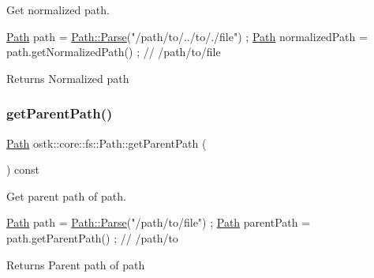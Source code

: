 Get normalized path. 


\begin{DoxyCode}
\hyperlink{classostk_1_1core_1_1fs_1_1_path_a1a5fff28594542489223b4cfad6cc9fb}{Path} path = \hyperlink{classostk_1_1core_1_1fs_1_1_path_ad08539ba654f5df11c4bcb07276345ad}{Path::Parse}(\textcolor{stringliteral}{"/path/to/../to/./file"}) ;
\hyperlink{classostk_1_1core_1_1fs_1_1_path_a1a5fff28594542489223b4cfad6cc9fb}{Path} normalizedPath = path.getNormalizedPath() ; \textcolor{comment}{// /path/to/file}
\end{DoxyCode}


\begin{DoxyReturn}{Returns}
Normalized path 
\end{DoxyReturn}
\mbox{\label{classostk_1_1core_1_1fs_1_1_path_a9304d079e30c775a45c07913d781c7cc}} 
\subsubsection{\texorpdfstring{get\+Parent\+Path()}{getParentPath()}}
{\footnotesize\ttfamily \hyperlink{classostk_1_1core_1_1fs_1_1_path}{Path} ostk\+::core\+::fs\+::\+Path\+::get\+Parent\+Path (\begin{DoxyParamCaption}{ }\end{DoxyParamCaption}) const}



Get parent path of path. 


\begin{DoxyCode}
\hyperlink{classostk_1_1core_1_1fs_1_1_path_a1a5fff28594542489223b4cfad6cc9fb}{Path} path = \hyperlink{classostk_1_1core_1_1fs_1_1_path_ad08539ba654f5df11c4bcb07276345ad}{Path::Parse}(\textcolor{stringliteral}{"/path/to/file"}) ;
\hyperlink{classostk_1_1core_1_1fs_1_1_path_a1a5fff28594542489223b4cfad6cc9fb}{Path} parentPath = path.getParentPath() ; \textcolor{comment}{// /path/to}
\end{DoxyCode}


\begin{DoxyReturn}{Returns}
Parent path of path 
\end{DoxyReturn}
\mbox{\label{classostk_1_1core_1_1fs_1_1_path_a171f914ecfcdeaf6a5b1f86bf9d49d4e}} 
